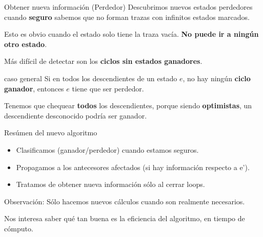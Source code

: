 \begin{frame}{Obtener nueva información (Perdedor)}
	Descubrimos nuevos estados perdedores cuando \textbf{seguro} sabemos que no forman trazas con infinitos estados marcados.
	
	\pause 
	
	Esto es obvio cuando el estado solo tiene la traza vacía. \textbf{No puede ir a ningún otro estado}.
	
	\pause 
	
	Más difícil de detectar son los \textbf{ciclos sin estados ganadores}.
	
	\pause
	
	\begin{block}{caso general}
		Si en todos los descendientes de un estado $e$, no hay ningún \textbf{ciclo ganador}, entonces $e$ tiene que ser perdedor. 
		
		Tenemos que chequear \textbf{todos} los descendientes, porque siendo \textbf{optimistas}, un descendiente desconocido podría ser ganador.
	\end{block}
	
\end{frame}
\begin{frame}{Resúmen del nuevo algoritmo}
    \begin{itemize}
     \item Clasificamos (ganador/perdedor) cuando estamos seguros. %
     \item Propagamos a los antecesores afectados (si hay información respecto a e').
     \item Tratamos de obtener nueva información sólo al cerrar loops.
    \end{itemize}
    
    \begin{block}{Observación:}
        Sólo hacemos nuevos cálculos cuando son realmente necesarios.
    \end{block}
    
    Nos interesa saber qué tan buena es la eficiencia del algoritmo, en tiempo de cómputo.
\end{frame}


